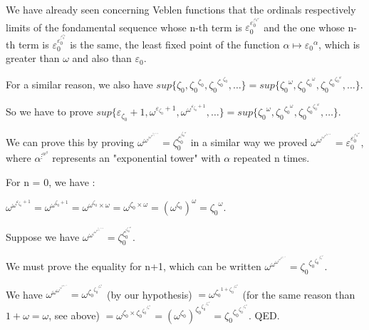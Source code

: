 \documentclass[10pt]{article}
\begin{document}
We have already seen concerning Veblen functions that the ordinals respectively limits of the fondamental sequence whose n-th term is \(\varepsilon_0^{\varepsilon_0^{\vdots^{{\varepsilon_0}^\omega}}} \) and the one whose n-th term is \( \varepsilon_0^{\varepsilon_0^{\vdots^{\varepsilon_0^{\varepsilon_0}}}} \) is the same, the least fixed point of the function \( \alpha \mapsto {\varepsilon_0}^\alpha \), which is greater than \( \omega \) and also than \( \varepsilon_0 \).

For a similar reason, we also have \( sup \lbrace \zeta_0, {\zeta_0}^{\zeta_0}, {\zeta_0}^{{\zeta_0}^{\zeta_0}}, \ldots \rbrace = sup \lbrace {\zeta_0}^\omega, {\zeta_0}^{{\zeta_0}^\omega}, {\zeta_0}^{{\zeta_0}^{{\zeta_0}^\omega}}, \ldots \rbrace \).

So we have to prove \(  sup \lbrace \varepsilon_{\zeta_0}+1, \omega^{\varepsilon_{\zeta_0}+1}, \omega^{\omega^{\varepsilon_{\zeta_0}+1}}, \ldots \rbrace = sup \lbrace {\zeta_0}^\omega, {\zeta_0}^{{\zeta_0}^\omega}, {\zeta_0}^{{\zeta_0}^{{\zeta_0}^\omega}}, \ldots \rbrace \).

We can prove this by proving \( \omega^{\omega^{\vdots^{\omega^{\omega^{\varepsilon_{\zeta_0}+1}}}}} = \zeta_0^{\zeta_0^{\vdots^{{\zeta_0}^\omega}}} \) in a similar way we proved \( \omega^{\omega^{\vdots^{\omega^{\omega^{\varepsilon_0+1}}}}} = \varepsilon_0^{\varepsilon_0^{\vdots^{{\varepsilon_0}^\omega}}} \), where \( \alpha^{\vdots^{\alpha^\beta}} \) represents an "exponential tower" with \( \alpha \) repeated n times.

For n = 0, we have : 

\( \omega^{\omega^{\varepsilon_{\zeta_0}+1}} = \omega^{\omega^{\zeta_0+1}} = \omega^{\omega^{\zeta_0} \times \omega} = \omega^{\zeta_0 \times \omega} = (\omega^{\zeta_0})^\omega = {\zeta_0}^\omega \).

Suppose we have \( \omega^{\omega^{\vdots^{\omega^{\omega^{\varepsilon_{\zeta_0}+1}}}}} = \zeta_0^{\zeta_0^{\vdots^{{\zeta_0}^\omega}}} \).

We must prove the equality for n+1, which can be written \( \omega^{\omega^{\omega^{\vdots^{\omega^{\omega^{\varepsilon_{\zeta_0}+1}}}}}} = {\zeta_0}^{{\zeta_0}^{{\zeta_0}^{\vdots^{{\zeta_0}^\omega}}}} \). 

We have \( \omega^{\omega^{\omega^{\vdots^{\omega^{\omega^{\varepsilon_{\zeta_0}+1}}}}}} = \omega^{{\zeta_0}^{{\zeta_0}^{\vdots^{{\zeta_0}^\omega}}}} \) (by our hypothesis) \( = \omega^{{\zeta_0}^{1+{\zeta_0}^{\vdots^{{\zeta_0}^\omega}}}} \) (for the same reason than \( 1+\omega = \omega \), see above) \( = \omega^{{\zeta_0} \times {\zeta_0}^{{\zeta_0}^{\vdots^{{\zeta_0}^\omega}}}} = (\omega^{\zeta_0})^{{\zeta_0}^{{\zeta_0}^{\vdots^{{\zeta_0}^\omega}}}} = {\zeta_0}^{{\zeta_0}^{{\zeta_0}^{\vdots^{{\zeta_0}^\omega}}}} \). QED.
\end{document}
